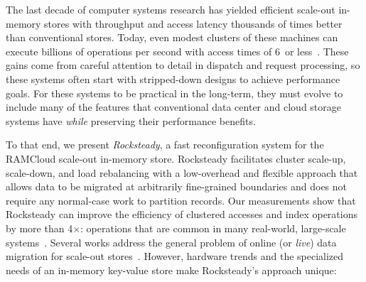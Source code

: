 \label{ref:intro}

The last decade of computer systems research has yielded efficient scale-out
in-memory stores with throughput and access latency thousands of times better
than conventional stores. Today, even modest clusters of these machines can
execute billions of operations per second with access times of 6~\us or
less~\cite{ramcloud,farm-2014}.  These gains come from careful attention to detail
in dispatch and request processing, so these systems often start with
stripped-down designs to achieve performance goals. For these
systems to be practical in the long-term, they must evolve to include many of the
features that conventional data center and cloud storage systems have
{\em while} preserving their performance benefits.

To that end, we present {\em Rocksteady}, a fast reconfiguration
system for the RAMCloud scale-out in-memory store. Rocksteady
facilitates cluster
scale-up, scale-down, and load rebalancing with a low-overhead and flexible
approach that allows data to be migrated at arbitrarily fine-grained boundaries and does not
require any normal-case work to partition records.  Our measurements show that
Rocksteady can improve the efficiency of clustered accesses and index
operations by more than 4$\times$: operations that are common in many
real-world, large-scale systems~\cite{fb-memcache,spanner}.  Several works
address the general problem of online (or {\em live}) data migration for
scale-out
stores~\cite{slacker,estore,squall,albatross,zephyr,dynamo,spanner}.
However, hardware trends and the specialized needs of an in-memory
key-value store
make Rocksteady's approach unique:

